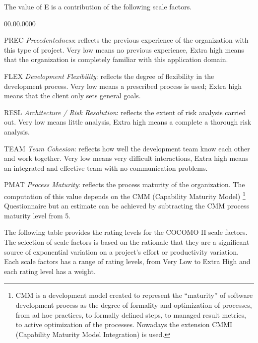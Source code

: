 The value of E is a contribution of the following scale factors.
\begin{lyxlist}{00.00.0000}
\item [{PREC}] \emph{Precedentedness}: reflects the previous experience
of the organization with this type of project. Very low means no previous
experience, Extra high means that the organization is completely familiar
with this application domain.
\item [{FLEX}] \emph{Development Flexibility}: reflects the degree of flexibility
in the development process. Very low means a prescribed process is
used; Extra high means that the client only sets general goals.
\item [{RESL}] \emph{Architecture / Risk Resolution}: reflects the extent
of risk analysis carried out. Very low means little analysis, Extra
high means a complete a thorough risk analysis.
\item [{TEAM}] \emph{Team Cohesion}: reflects how well the development
team know each other and work together. Very low means very difficult
interactions, Extra high means an integrated and effective team with
no communication problems.
\item [{PMAT}] \emph{Process Maturity}: reflects the process maturity of
the organization. The computation of this value depends on the CMM
(Capability Maturity Model)%
\footnote{CMM is a development model created to represent the ``maturity''
of software development process as the degree of formality and optimization
of processes, from ad hoc practices, to formally defined steps, to
managed result metrics, to active optimization of the processes. Nowadays
the extension CMMI (Capability Maturity Model Integration) is used.%
} Questionnaire but an estimate can be achieved by subtracting the
CMM process maturity level from 5. 
\end{lyxlist}
The following table provides the rating levels for the COCOMO II scale
factors. The selection of scale factors is based on the rationale
that they are a significant source of exponential variation on a project’s
effort or productivity variation. Each scale factors has a range of
rating levels, from Very Low to Extra High and each rating level has
a weight.

\medskip{}


